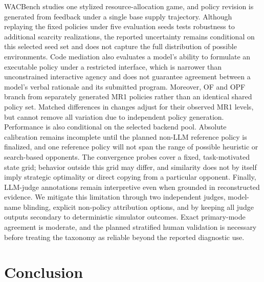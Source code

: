 \documentclass[letterpaper]{article} %
\begin{document}
WACBench studies one stylized resource-allocation game, and policy
revision is generated from feedback under a single base supply
trajectory. Although replaying the fixed policies under five evaluation
seeds tests robustness to additional scarcity realizations, the reported
uncertainty remains conditional on this selected seed set and does not
capture the full distribution of possible environments. Code mediation
also evaluates a model's ability to formulate an executable policy under
a restricted interface, which is narrower than unconstrained interactive
agency and does not guarantee agreement between a model's verbal rationale
and its submitted program. Moreover, OF and OPF branch from separately
generated MR1 policies rather than an identical shared policy set. Matched
differences in changes adjust for their observed MR1 levels, but cannot remove
all variation due to independent policy generation. Performance is also
conditional on the selected backend pool. Absolute calibration remains
incomplete until the planned non-LLM reference policy is finalized, and one
reference policy will not span the range of possible heuristic or
search-based opponents. The convergence probes cover a fixed, task-motivated
state grid;
behavior outside this grid may differ, and similarity does not by itself
imply strategic optimality or direct copying from a particular opponent.
Finally, LLM-judge annotations remain interpretive even when grounded in
reconstructed evidence. We mitigate this limitation through two independent
judges, model-name blinding, explicit non-policy attribution options, and by
keeping all judge outputs secondary to deterministic simulator outcomes.
Exact primary-mode agreement is moderate, and the planned stratified human
validation is necessary before treating the taxonomy as reliable beyond the
reported diagnostic use.

\section{Conclusion}
\end{document}
